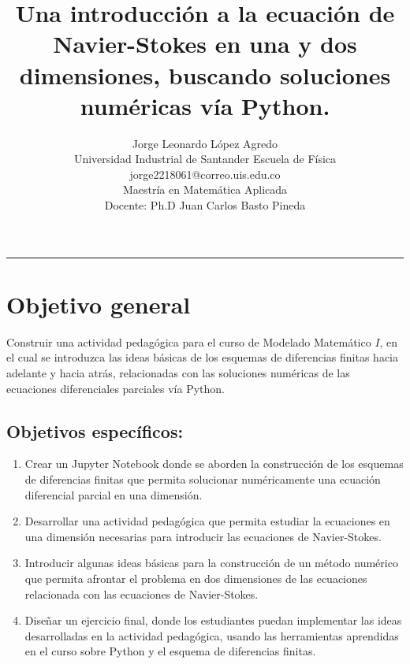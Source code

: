 \documentclass[A4,10pt]{article}
\title{{\huge \textbf{Una introducción a la ecuación de Navier-Stokes en una y dos dimensiones, buscando soluciones numéricas vía Python.}}}
\author{Jorge Leonardo López Agredo\\ 
	\small Universidad Industrial de Santander Escuela de Física\\
	 \small jorge2218061@correo.uis.edu.co\\ 
	\small Maestría en Matemática Aplicada\\
	 Docente: Ph.D Juan Carlos Basto Pineda\\ 
	\date{}
 }
\begin{document}
	\maketitle
	\vspace*{-1.5cm}
\begin{center}\rule{0.9\textwidth}{0.1mm} \end{center}

\section{Objetivo general}

Construir una actividad pedagógica para el curso de Modelado Matemático $I$, en el cual se introduzca las ideas básicas  de  los esquemas de diferencias finitas hacia adelante y hacia atrás, relacionadas con las soluciones numéricas de las ecuaciones diferenciales parciales vía Python.
\subsection{Objetivos específicos:}
\begin{enumerate}
	\item Crear un Jupyter Notebook donde se aborden la construcción de los esquemas de diferencias finitas que permita solucionar numéricamente una ecuación diferencial parcial en una dimensión.
	
	\item Desarrollar una actividad pedagógica que permita estudiar la ecuaciones en una dimensión necesarias para introducir las ecuaciones de Navier-Stokes.
	
	\item Introducir algunas ideas básicas para la construcción de un método numérico que permita afrontar el problema en dos dimensiones de las ecuaciones relacionada con las ecuaciones de Navier-Stokes.
	
	\item  Diseñar un ejercicio final, donde los estudiantes puedan implementar las ideas desarrolladas en la actividad pedagógica, usando las herramientas aprendidas en el curso sobre Python y el esquema de diferencias finitas.

	
\end{enumerate}
\end{document}
